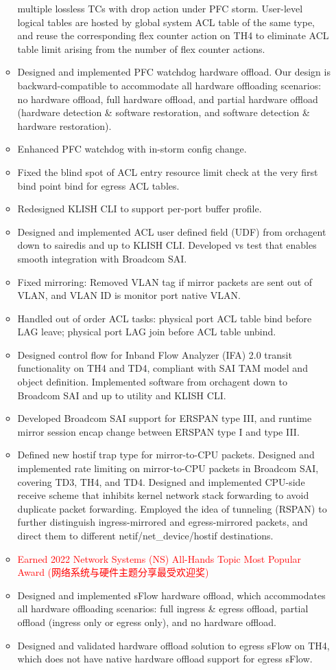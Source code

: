 \documentclass[letterpaper,11pt]{article}
\newcommand{\resitem}[1]{\item #1 \vspace{-2pt}}
\begin{document}
\begin{CJK}{UTF8}{gbsn}
\begin{itemize}
\begin{itemize}
{  multiple lossless TCs with drop action under PFC storm.
  User-level logical tables are hosted by global system ACL table of the same type, and reuse the corresponding flex counter action on TH4 to
  eliminate ACL table limit arising from the number of flex counter actions.}
  \resitem{Designed and implemented PFC watchdog hardware offload. Our design is backward-compatible to accommodate all hardware offloading scenarios:
  no hardware offload, full hardware offload, and partial hardware offload (hardware detection \& software restoration,
  and software detection \& hardware restoration).}
  \resitem{Enhanced PFC watchdog with in-storm config change.}
  \resitem{Fixed the blind spot of ACL entry resource limit check at the very first bind point bind for egress ACL tables.}
  \resitem{Redesigned KLISH CLI to support per-port buffer profile.}
  \resitem{Designed and implemented ACL user defined field (UDF) from orchagent down to sairedis and up to KLISH CLI.
  Developed vs test that enables smooth integration with Broadcom SAI.}
  \resitem{Fixed mirroring: Removed VLAN tag if mirror packets are sent out of VLAN, and VLAN ID is monitor port native VLAN.}
  \resitem{Handled out of order ACL tasks: physical port ACL table bind before LAG leave; physical port LAG join before ACL table unbind.}

  \resitem{Designed control flow for Inband Flow Analyzer (IFA) 2.0 transit functionality on TH4 and TD4,
  compliant with SAI TAM model and object definition. Implemented software from orchagent down to Broadcom SAI and up to utility and KLISH CLI.}
  \resitem{Developed Broadcom SAI support for ERSPAN type III, and runtime mirror session encap change between ERSPAN type I and type III.}
  \resitem{Defined new hostif trap type for mirror-to-CPU packets. Designed and implemented rate limiting on mirror-to-CPU packets in Broadcom SAI,
  covering TD3, TH4, and TD4.
  Designed and implemented CPU-side receive scheme that inhibits kernel network stack forwarding to avoid duplicate packet forwarding.
  Employed the idea of tunneling (RSPAN) to further distinguish ingress-mirrored and egress-mirrored packets,
  and direct them to different netif/net\_device/hostif destinations.}
  \resitem{\textcolor{Red}{Earned 2022 Network Systems (NS) All-Hands Topic Most Popular Award (网络系统与硬件主题分享最受欢迎奖)}}
  \resitem{Designed and implemented sFlow hardware offload, which accommodates all hardware offloading scenarios:
  full ingress \& egress offload, partial offload (ingress only or egress only), and no hardware offload.}
  \resitem{Designed and validated hardware offload solution to egress sFlow on TH4, which does not have native
  hardware offload support for egress sFlow.}
  \end{itemize}


\end{itemize}
\end{CJK}
\end{document}
